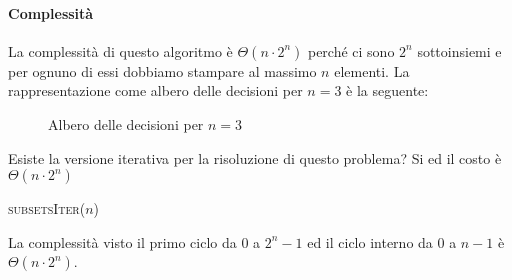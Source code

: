             \paragraph{Complessità} La complessità di questo algoritmo è $\Theta(n\cdot 2^n)$ perché ci sono $2^n$ sottoinsiemi e per ognuno di essi dobbiamo stampare al massimo $n$ elementi. La rappresentazione come albero delle decisioni per $n = 3$ è la seguente:
            \begin{figure}[H]
                \centering
                \caption{Albero delle decisioni per $n = 3$}
            \end{figure}
            Esiste la versione iterativa per la risoluzione di questo problema? Si ed il costo è $\Theta(n\cdot 2^n)$
            \begin{algorithm}[H]
                \caption{\textsc{subsetsIter}(\Int $n$)}
                \begin{algorithmic}
                        \State {}
                             
                                \State {}
                            \EndIf
                        \EndFor
                        \State {}
                    \EndFor
                \end{algorithmic}
            \end{algorithm}
            La complessità visto il primo ciclo da $0$ a $2^n - 1$ ed il ciclo interno da $0$ a $n - 1$ è $\Theta(n\cdot 2^n)$.

